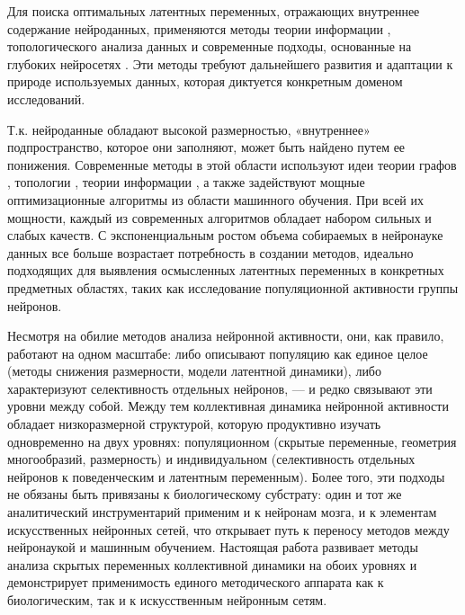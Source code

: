 Для поиска оптимальных латентных переменных, отражающих внутреннее содержание нейроданных, применяются методы теории информации \cite{Williamson2015}, топологического анализа данных \cite{Chaudhuri2019} и современные подходы, основанные на глубоких нейросетях \cite{Pandarinath2018}. Эти методы требуют дальнейшего развития и адаптации к природе используемых данных, которая диктуется конкретным доменом исследований.

Т.к. нейроданные обладают высокой размерностью, «внутреннее» подпространство, которое они заполняют, может быть найдено путем ее понижения. Современные методы в этой области используют идеи теории графов \cite{Belkin2003}, топологии \cite{McInnes2018}, теории информации \cite{vandermaaten08a}, а также задействуют мощные оптимизационные алгоритмы из области машинного обучения. При всей их мощности, каждый из современных алгоритмов обладает набором сильных и слабых качеств. С экспоненциальным ростом объема собираемых в нейронауке данных \cite{Stevenson2011, Hong2019} все больше возрастает потребность в создании методов, идеально подходящих для выявления осмысленных латентных переменных в конкретных предметных областях, таких как исследование популяционной активности группы нейронов.


\ifsynopsis

\else

\fi


Несмотря на обилие методов анализа нейронной активности, они, как правило,
работают на одном масштабе: либо описывают популяцию как единое целое (методы
снижения размерности, модели латентной динамики), либо характеризуют
селективность отдельных нейронов, --- и редко связывают эти уровни между собой.
Между тем коллективная динамика нейронной активности обладает низкоразмерной
структурой, которую продуктивно изучать одновременно на двух уровнях:
популяционном (скрытые переменные, геометрия многообразий, размерность) и
индивидуальном (селективность отдельных нейронов к поведенческим и латентным
переменным). Более того, эти подходы не обязаны быть привязаны к биологическому
субстрату: один и тот же аналитический инструментарий применим и к нейронам
мозга, и к элементам искусственных нейронных сетей, что открывает путь к
переносу методов между нейронаукой и машинным обучением. Настоящая работа
развивает методы анализа скрытых переменных коллективной динамики на обоих
уровнях и демонстрирует применимость единого методического аппарата как к
биологическим, так и к искусственным нейронным сетям.

